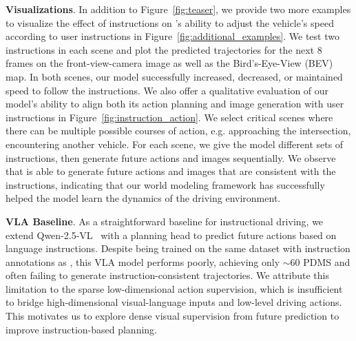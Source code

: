 \textbf{Visualizations}. 
In addition to Figure~\ref{fig:teaser}, we provide two more examples to visualize the effect of instructions on \model's ability to adjust the vehicle's speed according to user instructions in Figure~\ref{fig:additional_examples}. We test two instructions in each scene and plot the predicted trajectories for the next 8 frames on the front-view-camera image as well as the Bird's-Eye-View (BEV) map. In both scenes, our model successfully increased, decreased, or maintained speed to follow the instructions. 
We also offer a qualitative evaluation of our model's ability to align both its action planning and image generation with user instructions in Figure~\ref{fig:instruction_action}. We select critical scenes where there can be multiple possible courses of action, e.g. approaching the intersection, encountering another vehicle. For each scene, we give the model different sets of instructions, then generate future actions and images sequentially. We observe that \model is able to generate future actions and images that are consistent with the instructions, indicating that our world modeling framework has successfully helped the model learn the dynamics of the driving environment. 

\textbf{VLA Baseline}.
As a straightforward baseline for instructional driving, we extend Qwen-2.5-VL~\cite{qwen2_5} with a planning head to predict future actions based on language instructions. Despite being trained on the same dataset with instruction annotations as \model, this VLA model performs poorly, achieving only $\sim 60$ PDMS and often failing to generate instruction-consistent trajectories. We attribute this limitation to the sparse low-dimensional action supervision, which is insufficient to bridge high-dimensional visual-language inputs and low-level driving actions. This motivates us to explore dense visual supervision from future prediction to improve instruction-based planning.
